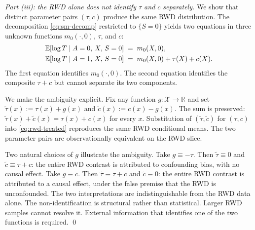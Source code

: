 \emph{Part (iii): the RWD alone does not identify $\tau$ and $c$ separately.}
We show that distinct parameter pairs $(\tau, c)$ produce the same RWD distribution.
The decomposition \eqref{eq:sm-decomp} restricted to $\{S = 0\}$ yields two equations in three unknown functions $m_0(\cdot, 0)$, $\tau$, and $c$:
\begin{align}
\mathbb{E}[\log T \mid A = 0,\, X,\, S = 0] &\;=\; m_0(X, 0), \label{eq:rwd-control}\\
\mathbb{E}[\log T \mid A = 1,\, X,\, S = 0] &\;=\; m_0(X, 0) + \tau(X) + c(X). \label{eq:rwd-treated}
\end{align}
The first equation identifies $m_0(\cdot, 0)$.
The second equation identifies the composite $\tau + c$ but cannot separate its two components.

We make the ambiguity explicit.
Fix any function $g : \mathcal{X} \to \mathbb{R}$ and set $\tilde\tau(x) := \tau(x) + g(x)$ and $\tilde c(x) := c(x) - g(x)$.
The sum is preserved: $\tilde\tau(x) + \tilde c(x) = \tau(x) + c(x)$ for every $x$.
Substitution of $(\tilde\tau, \tilde c)$ for $(\tau, c)$ into \eqref{eq:rwd-treated} reproduces the same RWD conditional means.
The two parameter pairs are observationally equivalent on the RWD slice.

Two natural choices of $g$ illustrate the ambiguity.
Take $g \equiv -\tau$.
Then $\tilde\tau \equiv 0$ and $\tilde c \equiv \tau + c$: the entire RWD contrast is attributed to confounding bias, with no causal effect.
Take $g \equiv c$.
Then $\tilde\tau \equiv \tau + c$ and $\tilde c \equiv 0$: the entire RWD contrast is attributed to a causal effect, under the false premise that the RWD is unconfounded.
The two interpretations are indistinguishable from the RWD data alone.
The non-identification is structural rather than statistical.
Larger RWD samples cannot resolve it.
External information that identifies one of the two functions is required.
\qed






